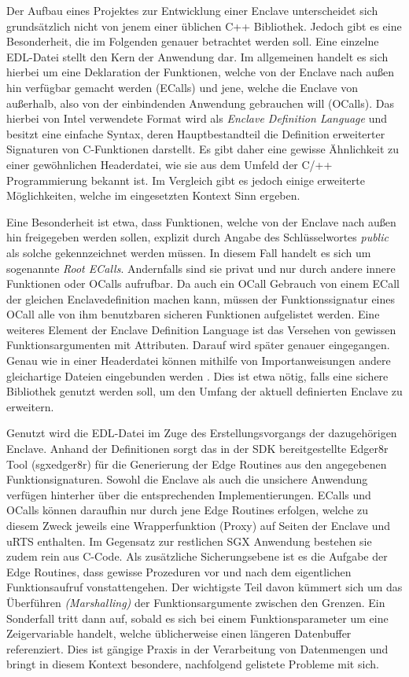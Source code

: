 Der Aufbau eines Projektes zur Entwicklung einer Enclave unterscheidet sich grundsätzlich nicht von jenem einer üblichen C++ Bibliothek. Jedoch gibt es eine Besonderheit, die im Folgenden genauer betrachtet werden soll. Eine einzelne \ac{EDL}-Datei stellt den Kern der Anwendung dar. Im allgemeinen handelt es sich hierbei um eine Deklaration der Funktionen, welche von der Enclave nach außen hin verfügbar gemacht werden (\acp{ECall}) und jene, welche die Enclave von außerhalb, also von der einbindenden Anwendung gebrauchen will (\acp{OCall}). Das hierbei von Intel verwendete Format wird als \textit{Enclave Definition Language} und besitzt eine einfache Syntax, deren Hauptbestandteil die Definition erweiterter Signaturen von C-Funktionen darstellt. Es gibt daher eine gewisse Ähnlichkeit zu einer gewöhnlichen Headerdatei, wie sie aus dem Umfeld der C/++ Programmierung bekannt ist. Im Vergleich gibt es jedoch einige erweiterte Möglichkeiten, welche im eingesetzten Kontext Sinn ergeben.

Eine Besonderheit ist etwa, dass Funktionen, welche von der Enclave nach außen hin freigegeben werden sollen, explizit durch Angabe des Schlüsselwortes \textit{public} als solche gekennzeichnet werden müssen. In diesem Fall handelt es sich um sogenannte \textit{Root \acp{ECall}}. Andernfalls sind sie privat und nur durch andere innere Funktionen oder \acp{OCall} aufrufbar. Da auch ein \ac{OCall} Gebrauch von einem \ac{ECall} der gleichen Enclavedefinition machen kann, müssen der Funktionssignatur eines \ac{OCall} alle von ihm benutzbaren sicheren Funktionen aufgelistet werden. Eine weiteres Element der Enclave Definition Language ist das Versehen von gewissen Funktionsargumenten mit Attributen. Darauf wird später genauer eingegangen. Genau wie in einer Headerdatei können mithilfe von Importanweisungen andere gleichartige Dateien eingebunden werden \cite{WinDev}. Dies ist etwa nötig, falls eine sichere Bibliothek genutzt werden soll, um den Umfang der aktuell definierten Enclave zu erweitern.

Genutzt wird die \ac{EDL}-Datei im Zuge des Erstellungsvorgangs der dazugehörigen Enclave. Anhand der Definitionen sorgt das in der SDK bereitgestellte Edger8r Tool (sgx\textunderscore edger8r) für die Generierung der Edge Routines aus den angegebenen Funktionsignaturen. Sowohl die Enclave als auch die unsichere Anwendung verfügen hinterher über die entsprechenden Implementierungen. \acp{ECall} und \acp{OCall} können daraufhin nur durch jene Edge Routines erfolgen, welche zu diesem Zweck jeweils eine Wrapperfunktion (Proxy) auf Seiten der Enclave und \ac{uRTS} enthalten. Im Gegensatz zur restlichen \ac{SGX} Anwendung bestehen sie zudem rein aus C-Code. Als zusätzliche Sicherungsebene ist es die Aufgabe der Edge Routines, dass gewisse Prozeduren vor und nach dem eigentlichen Funktionsaufruf vonstattengehen. Der wichtigste Teil davon kümmert sich um das Überführen \textit{(Marshalling)} der Funktionsargumente zwischen den Grenzen. Ein Sonderfall tritt dann auf, sobald es sich bei einem Funktionsparameter um eine Zeigervariable handelt, welche üblicherweise einen längeren Datenbuffer referenziert. Dies ist gängige Praxis in der Verarbeitung von Datenmengen und bringt in diesem Kontext besondere, nachfolgend gelistete Probleme mit sich.

